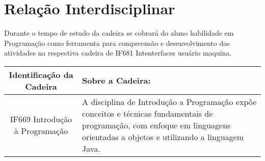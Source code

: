 \documentclass[10pt]{article}
\begin{document}
\section{Relação Interdisciplinar}

Durante o tempo de estudo da cadeira se cobrará do aluno habilidade em Programação como ferramenta para compreensão e desenvolvimento das atividades na respectiva cadeira de IF681 Intenterfaces usuário maquina.

\begin{center}
\begin{tabular}{|c|p{6cm}|}

\hline
Identificação da Cadeira & Sobre a Cadeira: \\ \hline
 IF669 Introdução à Programação &
 A disciplina de Introdução a Programação expõe conceitos e técnicas fundamentais de programação, com enfoque em linguagens orientadas a objetos e utilizando a linguagem Java.\cite{IF669}
 \\ \hline

\end{tabular}    
\end{center}



\end{document}

